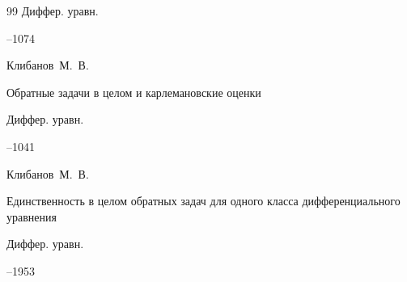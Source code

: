 \begin{thebibliography}{99}
\jour Диффер. уравн.




--1074












\by Клибанов~М.~В.

\paper Обратные задачи в целом и карлемановские оценки 

\jour Диффер. уравн.




--1041










\by Клибанов~М.~В.

\paper Единственность в целом обратных задач для одного класса дифференциального уравнения

\jour Диффер. уравн.




--1953










\end{thebibliography}
